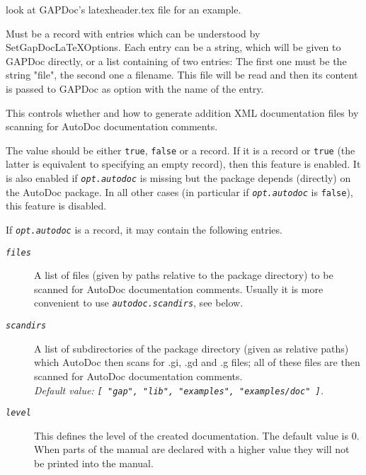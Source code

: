 \documentclass[a4paper,11pt]{report}
\begin{document}
{{{\begin{description}
\begin{description}
\begin{description}
look at GAPDoc's latexheader.tex file for an example. 
\item[{\mbox{\texttt{\mdseries\slshape gapdoc{\textunderscore}latex{\textunderscore}options}}}]  Must be a record with entries which can be understood by
SetGapDocLaTeXOptions. Each entry can be a string, which will be given to \textsf{GAPDoc} directly, or a list containing of two entries: The first one must be the
string "file", the second one a filename. This file will be read and then its
content is passed to \textsf{GAPDoc} as option with the name of the entry. 
\end{description}
 
\item[{\mbox{\texttt{\mdseries\slshape autodoc}}}]  This controls whether and how to generate addition XML documentation files by
scanning for \textsf{AutoDoc} documentation comments. 

 The value should be either \texttt{true}, \texttt{false} or a record. If it is a record or \texttt{true} (the latter is equivalent to specifying an empty record), then this feature is
enabled. It is also enabled if \mbox{\texttt{\mdseries\slshape opt.autodoc}} is missing but the package depends (directly) on the \textsf{AutoDoc} package. In all other cases (in particular if \mbox{\texttt{\mdseries\slshape opt.autodoc}} is \texttt{false}), this feature is disabled. 

 If \mbox{\texttt{\mdseries\slshape opt.autodoc}} is a record, it may contain the following entries. 
\begin{description}
\item[{\mbox{\texttt{\mdseries\slshape files}}}]  A list of files (given by paths relative to the package directory) to be
scanned for \textsf{AutoDoc} documentation comments. Usually it is more convenient to use \mbox{\texttt{\mdseries\slshape autodoc.scan{\textunderscore}dirs}}, see below. 
\item[{\mbox{\texttt{\mdseries\slshape scan{\textunderscore}dirs}}}]  A list of subdirectories of the package directory (given as relative paths)
which \textsf{AutoDoc} then scans for .gi, .gd and .g files; all of these files are then scanned for \textsf{AutoDoc} documentation comments. \\
 \emph{Default value: \texttt{[ "gap", "lib", "examples", "examples/doc" ]}.} 
\item[{\mbox{\texttt{\mdseries\slshape level}}}]  This defines the level of the created documentation. The default value is 0.
When parts of the manual are declared with a higher value they will not be
printed into the manual. 
\end{description}
 

\end{description}
\end{description}}}}
\end{document}
